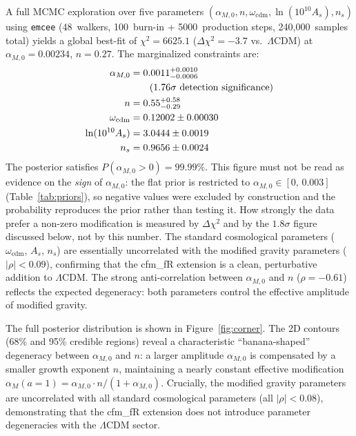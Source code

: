 \documentclass[aps,prd,twocolumn,superscriptaddress,nofootinbib]{revtex4-2}
\begin{document}
A full MCMC exploration over five parameters $(\alpha_{M,0}, n, \omega_{\mathrm{cdm}}, \ln(10^{10}A_s), n_s)$ using \texttt{emcee} (48~walkers, 100~burn-in + 5000~production steps, 240{,}000~samples total) yields a global best-fit of $\chi^2 = 6625.1$ ($\Delta\chi^2 = -3.7$ vs.\ $\Lambda$CDM) at $\alpha_{M,0} = 0.00234$, $n = 0.27$. The marginalized constraints are:
\begin{align}
\alpha_{M,0} &= 0.0011^{+0.0010}_{-0.0006} \notag \\
&\qquad (1.76\sigma \text{ detection significance}) \notag \\
n &= 0.55^{+0.58}_{-0.29} \notag \\
\omega_{\mathrm{cdm}} &= 0.12002 \pm 0.00030 \notag \\
\ln(10^{10}A_s) &= 3.0444 \pm 0.0019 \notag \\
n_s &= 0.9656 \pm 0.0024 \notag
\end{align}
The posterior satisfies $P(\alpha_{M,0} > 0) = 99.99\%$. This figure must not be read as evidence on the \textit{sign} of $\alpha_{M,0}$: the flat prior is restricted to $\alpha_{M,0} \in [0,\,0.003]$ (Table~\ref{tab:priors}), so negative values were excluded by construction and the probability reproduces the prior rather than testing it. How strongly the data prefer a non-zero modification is measured by $\Delta\chi^2$ and by the $1.8\sigma$ figure discussed below, not by this number. The standard cosmological parameters ($\omega_{\mathrm{cdm}}$, $A_s$, $n_s$) are essentially uncorrelated with the modified gravity parameters ($|\rho| < 0.09$), confirming that the cfm\_fR extension is a clean, perturbative addition to $\Lambda$CDM. The strong anti-correlation between $\alpha_{M,0}$ and $n$ ($\rho = -0.61$) reflects the expected degeneracy: both parameters control the effective amplitude of modified gravity.

The full posterior distribution is shown in Figure~\ref{fig:corner}. The 2D contours (68\% and 95\% credible regions) reveal a characteristic ``banana-shaped'' degeneracy between $\alpha_{M,0}$ and $n$: a larger amplitude $\alpha_{M,0}$ is compensated by a smaller growth exponent $n$, maintaining a nearly constant effective modification $\alpha_M(a=1) = \alpha_{M,0} \cdot n / (1 + \alpha_{M,0})$. Crucially, the modified gravity parameters are uncorrelated with all standard cosmological parameters (all $|\rho| < 0.08$), demonstrating that the cfm\_fR extension does not introduce parameter degeneracies with the $\Lambda$CDM sector.
\end{document}
